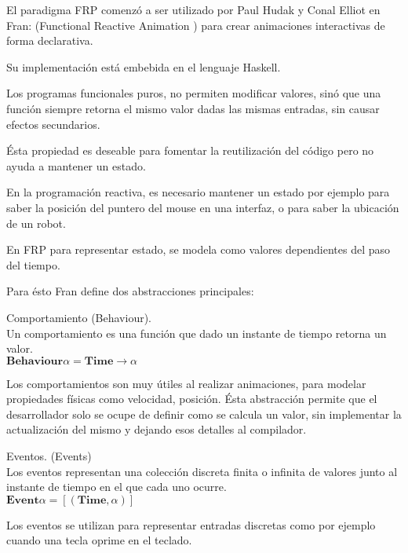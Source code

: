 

El paradigma FRP comenzó a ser utilizado por Paul Hudak y Conal Elliot en
Fran: (Functional Reactive Animation \cite{ElliottHudak97:Fran})
para crear animaciones interactivas de forma declarativa.

Su implementación está embebida en el lenguaje Haskell.

Los programas funcionales puros, no permiten modificar valores,
sinó que una función siempre retorna el mismo valor dadas las mismas
entradas, sin causar efectos secundarios.

Ésta propiedad es deseable para fomentar la reutilización del código
pero no ayuda a mantener un estado.

En la programación reactiva, es necesario mantener un estado por
ejemplo para saber la posición del puntero del mouse en una interfaz,
o para saber la ubicación de un robot.

En FRP para representar estado, se modela como valores dependientes
del paso del tiempo.

Para ésto Fran define dos abstracciones principales:
 
\begin{definicion}
  Comportamiento (Behaviour).\\

  Un comportamiento es una función que dado un instante de tiempo
  retorna un valor.\\
  
  $\textbf{Behaviour} \alpha = \textbf{Time} \rightarrow \alpha$

\end{definicion}

  Los comportamientos son muy útiles al realizar animaciones,
para modelar propiedades físicas como velocidad, posición.
  Ésta abstracción permite que el desarrollador solo se ocupe de
definir como se calcula un valor, sin implementar la actualización
del mismo y dejando esos detalles al compilador.

\begin{definicion}
  Eventos. (Events)\\

  Los eventos representan una colección discreta finita o infinita de valores
  junto al instante de tiempo en el que cada uno ocurre.\\

  $\textbf{Event} \alpha = [(\textbf{Time}, \alpha)]$

\end{definicion}

  Los eventos se utilizan para representar entradas discretas como por
ejemplo cuando una tecla oprime en el teclado.\\

  

